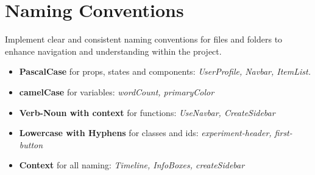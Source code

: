 \section{Naming Conventions} \label{sec:naming-conventions}  
Implement clear and consistent naming conventions for files and folders to enhance navigation and understanding within the project.

\begin{itemize}
    \item \textbf{PascalCase} for props, states and components: \textit{UserProfile, Navbar, ItemList.}
    \item \textbf{camelCase} for variables: \textit{wordCount, primaryColor}
    \item \textbf{Verb-Noun with context} for functions: \textit{UseNavbar, CreateSidebar}
    \item \textbf{Lowercase with Hyphens} for classes and ids: \textit{experiment-header, first-button}
    \item \textbf{Context} for all naming: \textit{Timeline, InfoBoxes, createSidebar}
\end{itemize}
